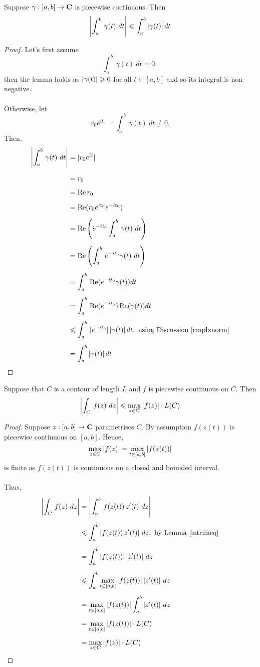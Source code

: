 \begin{lemma}\label{intriineq}
Suppose $\gamma:[a,b] \to \mathbf C$ is piecewise continuous. Then
\[\abs{\int_a^b\,\gamma(t)\ dt} \leq \int_a^b\abs{\gamma(t)}dt\]
\end{lemma}
\begin{proof}
Let's first assume 
\[\int_a^b\,\gamma(t)\ dt = 0,\]
then the lemma holds as $\left\lvert\gamma(t)\right\rvert \geqslant 0$ for all $t \in [a,b]$ and so its integral is non-negative.\\
\\
Otherwise, let
\[r_0e^{it_0} = \int_a^b\,\gamma(t)\ dt \neq 0.\]
Then,
\begin{align*}
\left\lvert\int_a^b\,\gamma(t)\ dt\right\rvert &= |r_0e^{it}|\\[0.5em]
&= r_0\\[0.5em]
&= \operatorname{Re} r_0\\[0.5em]
&= \operatorname{Re} (r_0e^{it_0}e^{-it_0})\\[0.5em]
&= \operatorname{Re} \left(e^{-it_0}\int_a^b\,\gamma(t)\ dt\right)\\[0.5em]
&= \operatorname{Re} \left(\int_a^b\,e^{-it_0}\gamma(t)\ dt\right)\\[0.5em]
&= \int_a^b\,\operatorname{Re} (e^{-it_0}\gamma(t)) dt\\[0.5em]
&= \int_a^b\,\operatorname{Re} (e^{-it_0})\operatorname{Re}(\gamma(t)) dt\\[0.5em]
&\leqslant \int_a^b\,|e^{-it_0}|\left\lvert\gamma(t)\right\rvert dt,\ \text{using Discussion \ref{cmplxnorm}}\\[0.5em]
&= \int_a^b\left\lvert\gamma(t)\right\rvert dt
\end{align*}
\end{proof}

\vspace*{1em}

\begin{theorem}\label{contourtriineq}
Suppose that $C$ is a contour of length $L$ and $f$ is piecewise continuous on $C$. Then
\[\left\lvert\int_C\,f(z)\ dz\right\rvert \leqslant \max_{z \in C}\left\lvert f(z)\right\rvert \cdot L(C)\]
\end{theorem}
\begin{proof}
Suppose $z:[a,b] \to \mathbf C$ parametrises $C$. By assumption $f(z(t))$ is piecewise continuous on $[a,b]$. Hence,
\[\max_{z \in C}\left\lvert f(z)\right\rvert = \max_{t \in [a,b]}\left\lvert f(z(t))\right\rvert\]
is finite as $f(z(t))$ is continuous on a closed and bounded interval.\\
\\
Thus,
\begin{align*}
\abs{\int_C\,f(z)\ dz} &= \abs{\int_a^b\,f(z(t))\,z'(t)\ dz}\\[0.5em]
 &\leq \int_a^b\abs{f(z(t))\,z'(t)}\, dz,\ \text{by Lemma \ref{intriineq}}\\[0.5em]
 &= \int_a^b\abs{f(z(t))}\abs{z'(t)}\, dz\\[0.5em]
 &\leq \int_a^b\max_{t \in [a,b]}\abs{f(z(t))}\abs{z'(t)}\, dz\\[0.5em]
 &= \max_{t \in [a,b]}\abs{f(z(t))}\int_a^b\abs{z'(t)}\, dz\\[0.5em]
 &= \max_{t \in [a,b]}\abs{f(z(t))}\cdot L(C)\\[0.5em]
 &= \max_{z \in C}\abs{f(z)}\cdot L(C)
\end{align*}
\end{proof}

